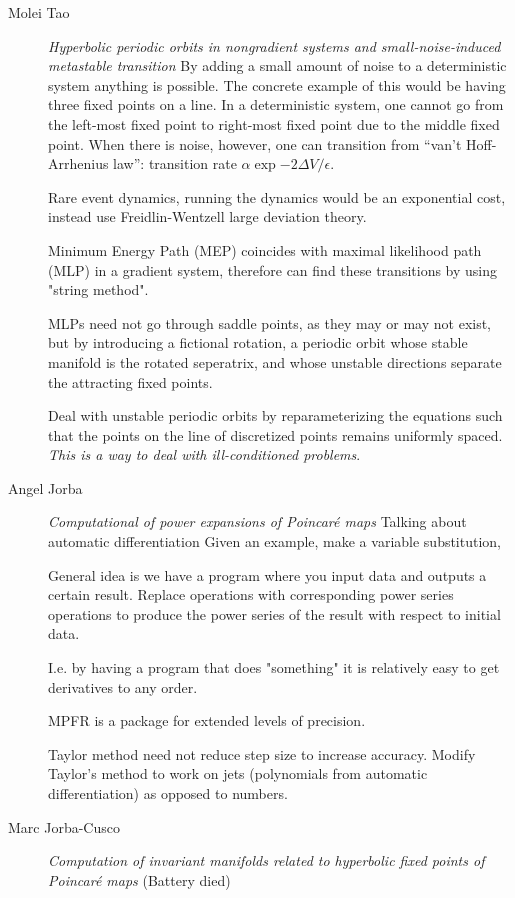 \begin{description}
{\begin{description}
\item[Molei Tao]
\textit{Hyperbolic periodic orbits in nongradient systems and small-noise-induced metastable transition}
By adding a small amount of noise to a deterministic system anything is possible. The concrete
example of this would be having three fixed points on a line. In a deterministic system, one cannot go from
the left-most fixed point to right-most fixed point due to the middle fixed point. When there is noise,
however, one can transition from
``van't Hoff-Arrhenius law'': transition rate $\alpha \exp{-2 \Delta V / \epsilon}$.

Rare event dynamics, running the dynamics would be an exponential cost, instead use Freidlin-Wentzell large
deviation theory.

Minimum Energy Path (MEP) coincides with maximal likelihood path (MLP) in a gradient system, therefore
can find these transitions by using "string method".

MLPs need not go through saddle points, as they may or may not exist, but by introducing a fictional rotation,
a periodic orbit whose stable manifold is the rotated seperatrix, and whose unstable directions separate the attracting
fixed points.

Deal with unstable periodic orbits by reparameterizing the equations such that the points on the line of
discretized points remains uniformly spaced. \emph{This is a way to deal with ill-conditioned problems}.

\item[Angel Jorba]
\textit{Computational of power expansions of Poincar\'e maps}
Talking about automatic differentiation
Given an example, make a variable substitution,

General idea is we have a program where you input data and outputs a certain result.
Replace operations with corresponding power series operations to produce the power series
of the result with respect to initial data.

I.e. by having a program
that does "something" it is relatively easy to get derivatives to any order.

MPFR is a package for extended levels of precision.

Taylor method need not reduce step size to increase accuracy.
Modify Taylor's method to work on jets (polynomials from automatic differentiation)
as opposed to numbers.

\item[Marc Jorba-Cusco]
\textit{Computation of invariant manifolds related to hyperbolic fixed points of Poincar\'e maps}
(Battery died)


\end{description}}
\end{description}
